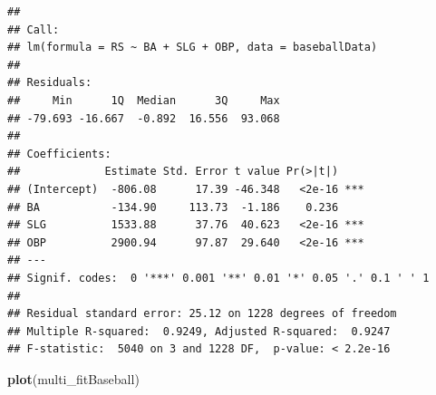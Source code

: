 \documentclass[
]{article}
\newenvironment{Shaded}{\begin{snugshade}}{\end{snugshade}}
\newcommand{\KeywordTok}[1]{\textcolor[rgb]{0.13,0.29,0.53}{\textbf{#1}}}
\newcommand{\NormalTok}[1]{#1}
\begin{document}
\begin{verbatim}
## 
## Call:
## lm(formula = RS ~ BA + SLG + OBP, data = baseballData)
## 
## Residuals:
##     Min      1Q  Median      3Q     Max 
## -79.693 -16.667  -0.892  16.556  93.068 
## 
## Coefficients:
##             Estimate Std. Error t value Pr(>|t|)    
## (Intercept)  -806.08      17.39 -46.348   <2e-16 ***
## BA           -134.90     113.73  -1.186    0.236    
## SLG          1533.88      37.76  40.623   <2e-16 ***
## OBP          2900.94      97.87  29.640   <2e-16 ***
## ---
## Signif. codes:  0 '***' 0.001 '**' 0.01 '*' 0.05 '.' 0.1 ' ' 1
## 
## Residual standard error: 25.12 on 1228 degrees of freedom
## Multiple R-squared:  0.9249, Adjusted R-squared:  0.9247 
## F-statistic:  5040 on 3 and 1228 DF,  p-value: < 2.2e-16
\end{verbatim}

\begin{Shaded}
\begin{Highlighting}[]
\KeywordTok{plot}\NormalTok{(multi_fitBaseball)}
\end{Highlighting}
\end{Shaded}
\end{document}
